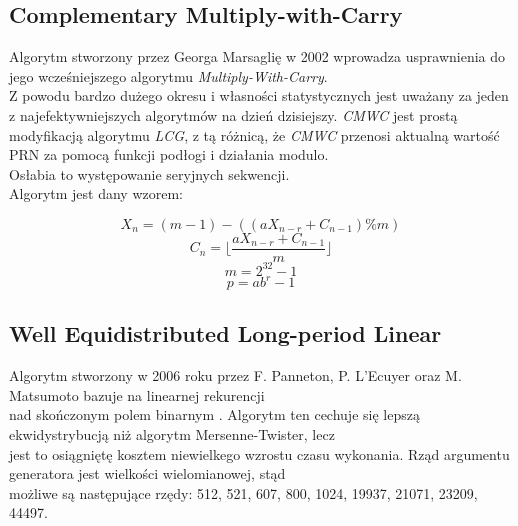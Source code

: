 \documentclass[a4paper, 11pt]{article} %
\begin{document}
\subsection{Complementary Multiply-with-Carry}
Algorytm stworzony przez Georga Marsaglię w 2002 wprowadza usprawnienia
do jego wcześniejszego algorytmu \textit{Multiply-With-Carry}.\\
Z powodu bardzo dużego okresu i własności statystycznych jest
uważany za jeden z najefektywniejszych algorytmów na dzień dzisiejszy.
\textit{CMWC} jest prostą modyfikacją algorytmu \textit{LCG}, z tą różnicą, że \textit{CMWC}
przenosi aktualną wartość PRN za pomocą funkcji podłogi i
działania modulo. \\Osłabia to występowanie seryjnych sekwencji.\\
Algorytm jest dany wzorem:

$$X_{n}=(m-1) - ((aX_{n-r} + C_{n-1}) \% m)$$
$$C_{n}=\lfloor \frac{aX_{n-r} + C_{n-1}}{m} \rfloor$$
$$m = 2^{32}-1$$
$$p=ab^{r}-1$$

\subsection{Well Equidistributed Long-period Linear}
Algorytm stworzony w 2006 roku przez F. Panneton, P. L'Ecuyer oraz M. Matsumoto bazuje na linearnej rekurencji  \\
nad skończonym polem binarnym . Algorytm ten cechuje się lepszą ekwidystrybucją niż algorytm Mersenne-Twister, lecz \\
jest to osiągniętę kosztem niewielkego wzrostu czasu wykonania. Rząd argumentu generatora jest wielkości wielomianowej, stąd \\
możliwe są następujące rzędy: 512, 521, 607, 800, 1024, 19937, 21071, 23209, 44497.




%

%

\end{document}
